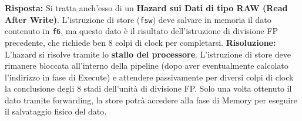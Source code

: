 \textbf{Risposta:} Si tratta anch'esso di un \textbf{Hazard sui Dati di tipo RAW (Read After Write)}. L'istruzione di store (\texttt{fsw}) deve salvare in memoria il dato contenuto in \texttt{f6}, ma questo dato è il risultato dell'istruzione di divisione FP precedente, che richiede ben 8 colpi di clock per completarsi.
\textbf{Risoluzione:} L'hazard si risolve tramite lo \textbf{stallo del processore}. L'istruzione di store deve rimanere bloccata all'interno della pipeline (dopo aver eventualmente calcolato l'indirizzo in fase di Execute) e attendere passivamente per diversi colpi di clock la conclusione degli 8 stadi dell'unità di divisione FP. Solo una volta ottenuto il dato tramite forwarding, la store potrà accedere alla fase di Memory per eseguire il salvataggio fisico del dato.